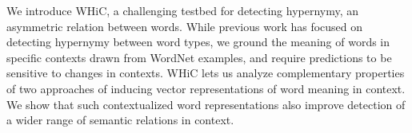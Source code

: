 We introduce WHiC, a challenging testbed for detecting hypernymy, an asymmetric relation between words. While previous work has focused on detecting hypernymy between word types, we ground the meaning of words in specific contexts drawn from WordNet examples, and require predictions to be sensitive to changes in contexts. WHiC lets us analyze complementary properties of two approaches of inducing vector representations of word meaning in context. We show that such contextualized word representations also improve detection of a wider range of semantic relations in context.
